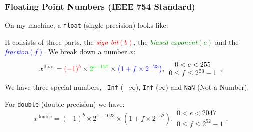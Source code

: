 \documentclass[table]{beamer}
\newif\ifschigh\schighfalse
\newcommand{\kw}[1]{\ifschigh\textcolor{red}{#1}\else\textcolor{keyword}{#1}\fi}
\begin{document}
\begin{frame}
\frametitle{Floating Point Numbers (IEEE 754 Standard)}
On my machine, a \kw{\tt float} (single precision) looks like:\\
\begin{center}
\end{center}
It consists of three parts, the \textcolor{red}{\emph{sign bit}$(b)$}, the \textcolor{green}{\emph{biased exponent}$(e)$} and the \textcolor{blue}{\emph{fraction}$(f)$}.
We break down a number $x$:
$$x^{\textrm{float}} = \textcolor{red}{(-1)^b} \times 
\textcolor{green}{2^{e-127}} \times \textcolor{blue}{\left(1+f\times2^{-23}\right)},
\begin{array}{c}
0 < e < 255\\0 \leq f \leq 2^{23}-1
\end{array},$$
We have three special numbers, {\tt -Inf} ($-\infty$), {\tt Inf} ($\infty$) and {\tt NaN} (Not a Number).

For \kw{\tt double} (double precision) we have:
$$x^{\textrm{double}} = (-1)^b\times 2^{e-1023}\times\left(1+f\times2^{-52}\right),
\begin{array}{c}
0 < e < 2047\\0 \leq f \leq 2^{52}-1
\end{array}.$$
\end{frame}
\end{document}
